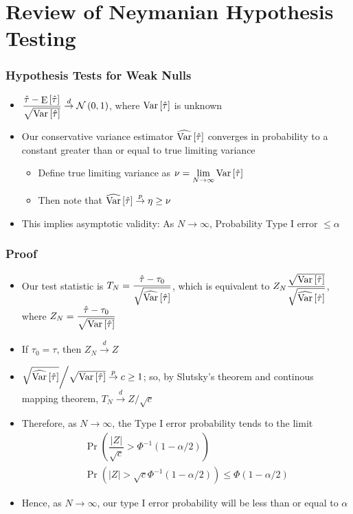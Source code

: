 \documentclass[table, xcolor = {dvipsnames}, 9pt]{beamer}
\theoremstyle{plain}
\DeclareMathOperator{\E}{\rm{E}}
\DeclareMathOperator{\Var}{\rm{Var}}
\begin{document}
\section{Review of Neymanian Hypothesis Testing}
\begin{frame}[t]
\frametitle{Hypothesis Tests for Weak Nulls} 
\vfill
\begin{itemize}
\item $\dfrac{\hat{\tau} - \E\left[\hat{\tau}\right]}{\sqrt{\Var\left[\hat{\tau}\right]}} \overset{d}{\to} \mathcal{N}\left(0, 1\right)$, where $\Var\left[\hat{\tau}\right]$ is unknown
\item Our conservative variance estimator $\widehat{\Var}\left[\hat{\tau}\right]$ converges in probability to a constant greater than or equal to true limiting variance
\begin{itemize}
\item Define true limiting variance as $\nu = \lim \limits_{N \to \infty} \Var\left[\hat{\tau}\right]$
\item Then note that $\widehat{\Var}\left[\hat{\tau}\right] \overset{p}{\to} \eta \geq \nu$
\end{itemize}  
\item This implies asymptotic validity: As $N \to \infty$, Probability Type I error $\leq \alpha$
\end{itemize}
\vfill
\end{frame}
\begin{frame}[t]
\frametitle{Proof} 
\vfill
\begin{itemize}
\item Our test statistic is $T_N = \dfrac{\hat{\tau} - \tau_0}{\sqrt{\widehat{\Var}\left[\hat{\tau}\right]}}$, which is  equivalent to $Z_N\dfrac{\sqrt{\Var\left[\hat{\tau}\right]}}{\sqrt{\widehat{\Var}\left[\hat{\tau}\right]}}$, where $Z_N = \dfrac{\hat{\tau} - \tau_0}{\sqrt{\Var\left[\hat{\tau}\right]}}$
\item If $\tau_0 = \tau$, then $Z_N \overset{d}{\to} Z$
\item $\sqrt{\widehat{\Var}\left[\hat{\tau}\right]} \bigg / \sqrt{\Var\left[\hat{\tau}\right]} \overset{p}{\to} c \geq 1$; so, by Slutsky's theorem and continous mapping theorem, $T_N \overset{d}{\to} Z / \sqrt{c}$
\item Therefore, as $N \to \infty$, the Type I error probability tends to the limit
\begin{align*}
\Pr\left(\dfrac{\left\lvert Z \right\rvert}{\sqrt{c}} > \Phi^{-1}(1 - \alpha / 2)\right) \\ 
\Pr\left(\left\lvert Z \right\rvert > \sqrt{c}\Phi^{-1}(1 - \alpha / 2)\right) \leq \Phi(1 - \alpha/2)
\end{align*}
\item Hence, as $N \to \infty$, our type I error probability will be less than or equal to $\alpha$
\end{itemize}
\vfill
\end{frame}
\end{document}
